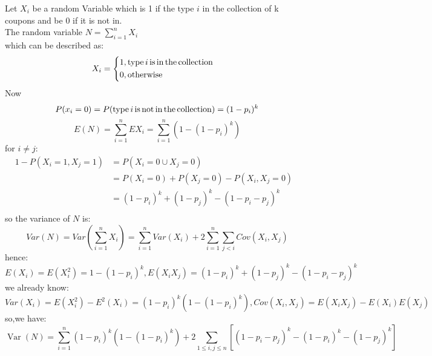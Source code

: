 \documentclass[12pt,onecolumn,journal]{IEEEtran}
\begin{document}
{
Let $X_i$ be a random Variable which is 1 if the type $i$ in the collection of k coupons and be 0 if it is not in.\\
The random variable $N=\sum_{i=1}^{n}X_i$\\
which can be described as:\\
\[
X_i=\left\{
\begin{aligned}
&1, {\rm type}\,i\,{\rm is\,in\,the\,collection}&\\
&0, {\rm otherwise}&\\
\end{aligned}
\right.    
\]
Now 
\[P(x_i=0)=P({\rm type}\,i\,{\rm is\,not\,in\,the\,collection})=(1-p_i)^k\]
\[E(N)=\sum_{i=1}^{n}E{X_i}=\sum_{i=1}^{n}(1-(1-p_i)^k)\]
for $i \neq j$:\\
\[
\begin{aligned}
1-P(X_i=1,X_j=1)&=P({X_i=0}\cup{X_j=0})&\\
&=P(X_i=0)+P(X_j=0)-P(X_i,X_j=0)&\\
&=(1-p_i)^k+(1-p_j)^k-(1-p_i-p_j)^k&\\
\end{aligned}
\]
so the variance of $N$ is:
\[Var(N)=Var(\sum_{i=1}^{n}X_i)=\sum_{i=1}^{n}Var(X_i)+2\sum_{i=1}^{n}\sum_{j<i}Cov(X_i,X_j)\]
hence:$E(X_i)=E(X^2_i)=1-(1-p_i)^k,E(X_iX_j)=(1-p_i)^k+(1-p_j)^k-(1-p_i-p_j)^k$\\
we already know:$Var(X_i)=E(X^{2}_i)-E^{2}(X_i)=(1-p_i)^k(1-(1-p_i)^k),Cov(X_i,X_j)=E(X_iX_j)-E(X_i)E(X_j)$
so,we have:
\[
\operatorname{Var}(N)=
\sum_{i=1}^{n}\left(1-p_{i}\right)^{k}\left(1-\left(1-p_{i}\right)^{k}\right)+
2 \sum_{1 \leq i, j \leq n}\left[\left(1-p_{i}-p_{j}\right)^{k}-\left(1-p_{i}\right)^{k}-\left(1-p_{j}\right)^{k}\right]    
\]
}
\\
\end{document}
